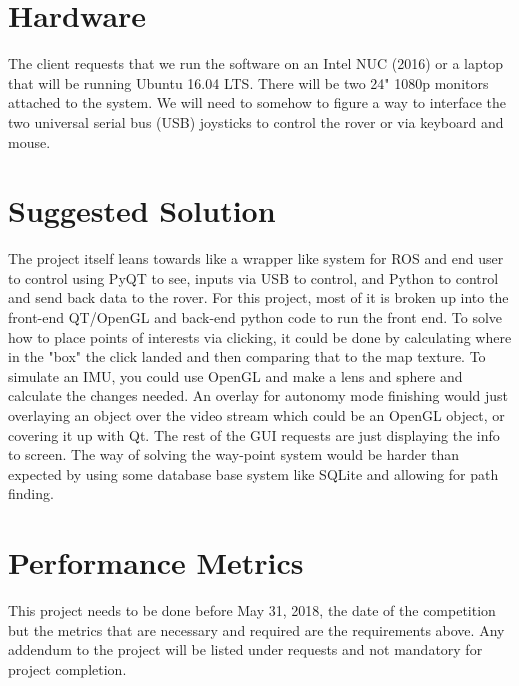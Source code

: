 \documentclass[onecolumn, draftclsnofoot, 10pt, compsoc]{IEEEtran}
\begin{document}
\section{Hardware}
The client requests that we run the software on an Intel NUC (2016) or a laptop that will be running Ubuntu 16.04 LTS. There will be two 24" 1080p monitors attached to the system. We will need to somehow to figure a way to interface the two universal serial bus (USB) joysticks to control the rover or via keyboard and mouse.  
\section{Suggested Solution}
The project itself leans towards like a wrapper like system for ROS and end user to control using PyQT to see, inputs via USB to control, and Python to control and send back data to the rover. For this project, most of it is broken up into the front-end QT/OpenGL and back-end python code to run the front end. To solve how to place points of interests via clicking, it could be done by calculating where in the "box" the click landed and then comparing that to the map texture. To simulate an IMU, you could use OpenGL and make a lens and sphere and calculate the changes needed. An overlay for autonomy mode finishing would just overlaying an object over the video stream which could be an OpenGL object, or covering it up with Qt. The rest of the GUI requests are just displaying the info to screen. The way of solving the way-point system would be harder than expected by using some database base system like SQLite and allowing for path finding.  

\section{Performance Metrics}
This project needs to be done before May 31, 2018, the date of the competition but the metrics that are necessary and required are the requirements above. Any addendum to the project will be listed under requests and not mandatory for project completion.   
\end{document}
